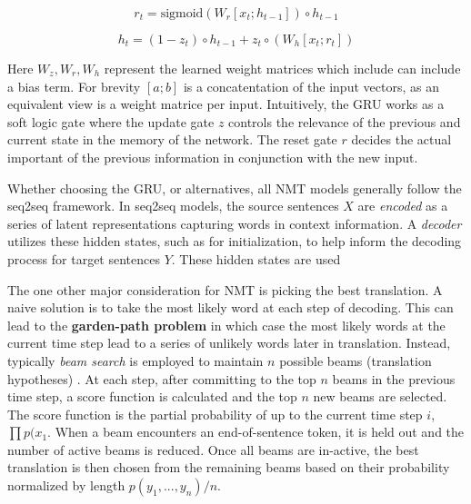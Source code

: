 \begin{equation} 
	r_{t} = \text{sigmoid}(W_{r} [x_{t}; h_{t-1}] )  \circ h_{t-1}%
\end{equation}

\begin{equation}
	h_{t} = (1 - z_{t}) \circ h_{t-1} + z_{t} \circ (W_{h} [x_{t}; r_{t} ]) %
\end{equation}

Here $W_{z}, W_{r}, W_{h}$ represent the learned weight matrices which include can include a bias term. For brevity $[a ; b]$ is a concatentation of the input vectors, as an equivalent view is a weight matrice per input. Intuitively, the \ac{GRU} works as a soft logic gate where the update gate $z$ controls the relevance of the previous and current state in the memory of the network. The reset gate $r$ decides the actual important of the previous information in conjunction with the new input. 

Whether choosing the \ac{GRU}, or alternatives,  all \ac{NMT} models generally follow the \ac{seq2seq} framework. In seq2seq models, the source sentences $X$ are \textit{encoded} as a series of latent representations capturing words in context information. A \textit{decoder} utilizes these hidden states, such as for initialization, to help inform the decoding process for target sentences $Y$. These hidden states are used 


The one other major consideration for \ac{NMT} is picking the best translation. A naive solution is to take the most likely word at each step of decoding. This can lead to the \textbf{garden-path problem} in which case the most likely words at the current time step lead to a series of unlikely words later in translation. Instead, typically \textit{beam search} is employed to maintain $n$ possible beams (translation hypotheses) \cite{koehn2017NMT}. At each step, after committing to the top $n$ beams  in the previous time step, a score function is calculated and the top $n$ new beams are selected. The score function is the partial probability of up to the current time step $i$, $\prod p(x_1{}$. When a beam encounters an end-of-sentence token, it is held out and the number of active beams is reduced. Once all beams are in-active, the best translation is then chosen from the remaining beams based on their probability normalized by length $p(y_{1}, ..., y_{n}) / n$. 





